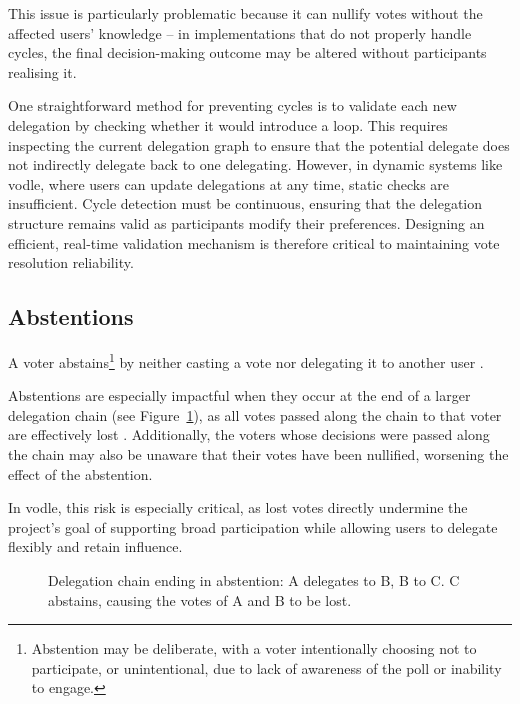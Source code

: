 This issue is particularly problematic because it can nullify votes without the affected users' knowledge -- in implementations that do not properly handle cycles, the final decision-making outcome may be altered without participants realising it.

One straightforward method for preventing cycles is to validate each new delegation by checking whether it would introduce a loop. This requires inspecting the current delegation graph to ensure that the potential delegate does not indirectly delegate back to one delegating. However, in dynamic systems like vodle, where users can update delegations at any time, static checks are insufficient. Cycle detection must be continuous, ensuring that the delegation structure remains valid as participants modify their preferences. Designing an efficient, real-time validation mechanism is therefore critical to maintaining vote resolution reliability.

\subsection*{Abstentions}

A voter abstains\footnote{Abstention may be deliberate, with a voter intentionally choosing not to participate, or unintentional, due to lack of awareness of the poll or inability to engage.} by neither casting a vote nor delegating it to another user \citep{brill_liquid_2022}.

Abstentions are especially impactful when they occur at the end of a larger delegation chain (see Figure~\ref{fig:delegation-abstention}), as all votes passed along the chain to that voter are effectively lost \citep{brill_liquid_2022}. Additionally, the voters whose decisions were passed along the chain may also be unaware that their votes have been nullified, worsening the effect of the abstention.

In vodle, this risk is especially critical, as lost votes directly undermine the project's goal of supporting broad participation while allowing users to delegate flexibly and retain influence.

\begin{figure}[H]
  \centering
  \caption{Delegation chain ending in abstention: A delegates to B, B to C. C abstains, causing the votes of A and B to be lost.}
  \label{fig:delegation-abstention}
\end{figure}

